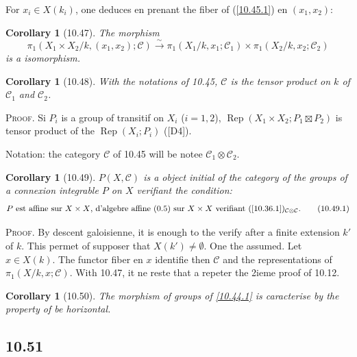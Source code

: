 \documentclass[12pt,a4paper]{article}
\theoremstyle{plain}
\newtheorem{corollary}[theorem]{Corollary}
\theoremstyle{definition}
\theoremstyle{remark}
\DeclareMathOperator{\Rep}{Rep}
\begin{document}
For $x_i \in X(k_i)$, one deduces en prenant the fiber of (\ref{10.45.1}) en $(x_1, x_2)$:

\begin{corollary}[10.47]
The morphism
$$\pi_1(X_1 \times X_2/k, (x_1, x_2); \mathcal{C}) \xrightarrow{\sim} \pi_1(X_1/k, x_1; \mathcal{C}_1) \times \pi_1(X_2/k, x_2; \mathcal{C}_2)$$
is a isomorphism.
\end{corollary}

\begin{corollary}[10.48]
With the notations of 10.45, $\mathcal{C}$ is the tensor product on $k$ of $\mathcal{C}_1$ and $\mathcal{C}_2$.
\end{corollary}

\textsc{Proof.} Si $P_i$ is a group of transitif on $X_i$ ($i = 1, 2$), $\Rep(X_1 \times X_2; P_1 \boxtimes P_2)$ is tensor product of the $\Rep(X_i; P_i)$ ([D4]).

Notation: the category $\mathcal{C}$ of 10.45 will be notee $\mathcal{C}_1 \otimes \mathcal{C}_2$.

\begin{corollary}[10.49]
$P(X, \mathcal{C})$ is a object initial of the category of the groups of a connexion integrable $P$ on $X$ verifiant the condition:
\begin{equation}\label{10.49.1}
\text{$P$ est affine sur $X \times X$, d'algebre affine (0.5) sur $X \times X$ verifiant (\ref{10.36.1})$_{\mathcal{C} \otimes \mathcal{C}}$.} \tag{10.49.1}
\end{equation}
\end{corollary}

\textsc{Proof.} By descent galoisienne, it is enough to the verify after a finite extension $k'$ of $k$. This permet of supposer that $X(k') \neq \emptyset$. One the assumed. Let $x \in X(k)$. The functor fiber en $x$ identifie then $\mathcal{C}$ and the representations of $\pi_1(X/k, x; \mathcal{C})$. With 10.47, it ne reste that a repeter the 2ieme proof of 10.12.

\begin{corollary}[10.50]
The morphism of groups of \ref{10.44.1} is caracterise by the property of be horizontal.
\end{corollary}

\subsection*{10.51}
\end{document}
